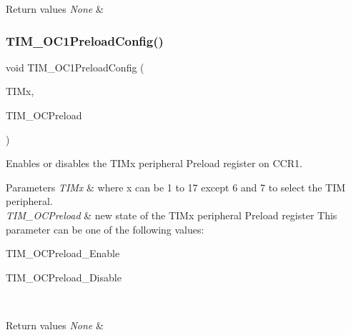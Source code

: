 \begin{DoxyRetVals}{Return values}
{\em None} & \\
\hline
\end{DoxyRetVals}
\mbox{\label{group___t_i_m___private___functions_ga60e6c29ad8f919bef616cf8e3306dd64}} 
\subsubsection{\texorpdfstring{TIM\_OC1PreloadConfig()}{TIM\_OC1PreloadConfig()}}
{\footnotesize\ttfamily void T\+I\+M\+\_\+\+O\+C1\+Preload\+Config (\begin{DoxyParamCaption}\item[{\mbox{\hyperlink{struct_t_i_m___type_def}{T\+I\+M\+\_\+\+Type\+Def}} $\ast$}]{T\+I\+Mx,  }\item[{uint16\+\_\+t}]{T\+I\+M\+\_\+\+O\+C\+Preload }\end{DoxyParamCaption})}



Enables or disables the T\+I\+Mx peripheral Preload register on C\+C\+R1. 


\begin{DoxyParams}{Parameters}
{\em T\+I\+Mx} & where x can be 1 to 17 except 6 and 7 to select the T\+IM peripheral. \\
\hline
{\em T\+I\+M\+\_\+\+O\+C\+Preload} & new state of the T\+I\+Mx peripheral Preload register This parameter can be one of the following values\+: \begin{DoxyItemize}
\item T\+I\+M\+\_\+\+O\+C\+Preload\+\_\+\+Enable \item T\+I\+M\+\_\+\+O\+C\+Preload\+\_\+\+Disable \end{DoxyItemize}
\\
\hline
\end{DoxyParams}

\begin{DoxyRetVals}{Return values}
{\em None} & \\
\hline
\end{DoxyRetVals}
\mbox{\label{group___t_i_m___private___functions_ga413359c87f46c69f1ffe2dc8fb3a65e7}} 
